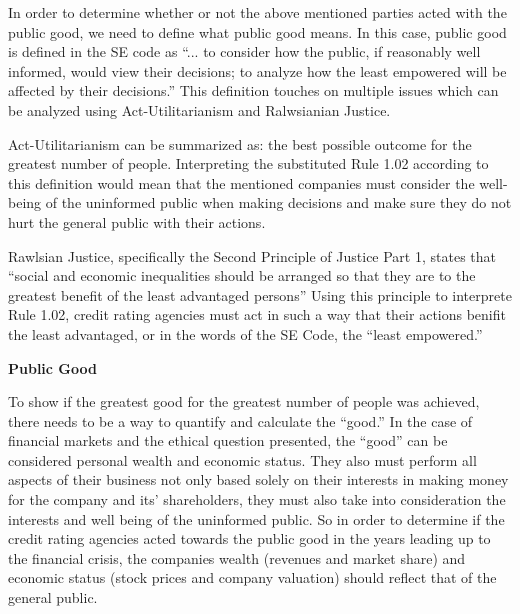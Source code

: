 \documentclass[11pt]{article}
\begin{document}
\begin{multicols}{2}
In order to determine whether or not the above mentioned parties acted with the public good, we need to define what public good means.  In this case, public good is defined in the SE code as ``... to consider how the public, if reasonably well informed, would view their decisions; to analyze how the least empowered will be affected by their decisions.'' \cite{SEcode}  This definition touches on multiple issues which can be analyzed using Act-Utilitarianism and Ralwsianian Justice. 

Act-Utilitarianism can be summarized as: the best possible outcome for the greatest number of people.\cite{utility}  Interpreting the substituted Rule 1.02 according to this definition would mean that the mentioned companies must consider the well-being of the uninformed public when making decisions and make sure they do not hurt the general public with their actions. 

Rawlsian Justice, specifically the Second Principle of Justice Part 1, states that ``social and economic inequalities should be arranged so that they are to the greatest benefit of the least advantaged persons'' \cite{rawlsian} Using this principle to interprete Rule 1.02, credit rating agencies must act in such a way that their actions benifit the least advantaged, or in the words of the SE Code, the ``least empowered.''  \cite{SEcode}

\textbf{Public Good}

To show if the greatest good for the greatest number of people was achieved, there needs to be a way to quantify and calculate the ``good.''  In the case of financial markets and the ethical question presented, the ``good'' can be considered personal wealth and economic status.  They also must perform all aspects of their business not only based solely on their interests in making money for the company and its' shareholders, they must also take into consideration the interests and well being of the uninformed public.  So in order to determine if the credit rating agencies acted towards the public good in the years leading up to the financial crisis, the companies wealth (revenues and market share) and economic status (stock prices and company valuation) should reflect that of the general public.


\end{multicols}
\end{document}
